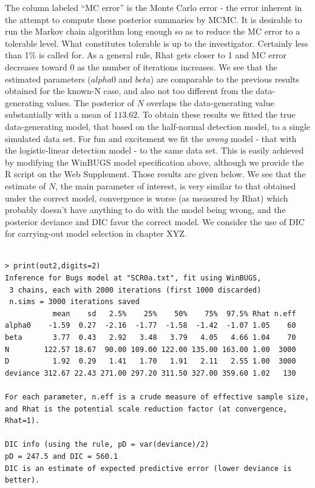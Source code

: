 The column labeled ``MC error'' is the Monte Carlo error - the error inherent in the attempt to compute these posterior summaries by MCMC. It is desirable to run the Markov chain algorithm long enough so as to reduce the MC error to a tolerable level. What constitutes tolerable is up to the investigator. Certainly less than 1\% is called for. As a general rule, Rhat gets closer to 1 and MC error decreases toward 0 as the number of iterations increases.  We see that the estimated parameters ($alpha$0 and $beta$) are comparable to the previous results obtained for the known-N case, and also not too different from the data-generating values. The posterior of $N$ overlaps the data-generating value substantially with a mean of $113.62$. 
To obtain these results we fitted the true data-generating model, that based on the half-normal detection model, to a single simulated data set. For fun and excitement we fit the {\it wrong} model - that with the logistic-linear detection model - to the same data set. This is easily achieved by modifying the WinBUGS model specification above, although we provide the R script on the Web Supplement. Those results are given below. We see that the estimate of $N$, the main parameter of interest, is very similar to that obtained under the correct model, convergence is worse (as measured by Rhat) which probably doesn't have anything to do with the model being wrong, and the posterior deviance and DIC favor the correct model. We consider the use of DIC for carrying-out model selection in chapter XYZ.  
\begin{verbatim}

> print(out2,digits=2)
Inference for Bugs model at "SCR0a.txt", fit using WinBUGS,
 3 chains, each with 2000 iterations (first 1000 discarded)
 n.sims = 3000 iterations saved
           mean    sd   2.5%    25%    50%    75%  97.5% Rhat n.eff
alpha0    -1.59  0.27  -2.16  -1.77  -1.58  -1.42  -1.07 1.05    60
beta       3.77  0.43   2.92   3.48   3.79   4.05   4.66 1.04    70
N        122.57 18.67  90.00 109.00 122.00 135.00 163.00 1.00  3000
D          1.92  0.29   1.41   1.70   1.91   2.11   2.55 1.00  3000
deviance 312.67 22.43 271.00 297.20 311.50 327.00 359.60 1.02   130

For each parameter, n.eff is a crude measure of effective sample size,
and Rhat is the potential scale reduction factor (at convergence, Rhat=1).

DIC info (using the rule, pD = var(deviance)/2)
pD = 247.5 and DIC = 560.1
DIC is an estimate of expected predictive error (lower deviance is better).
\end{verbatim}

